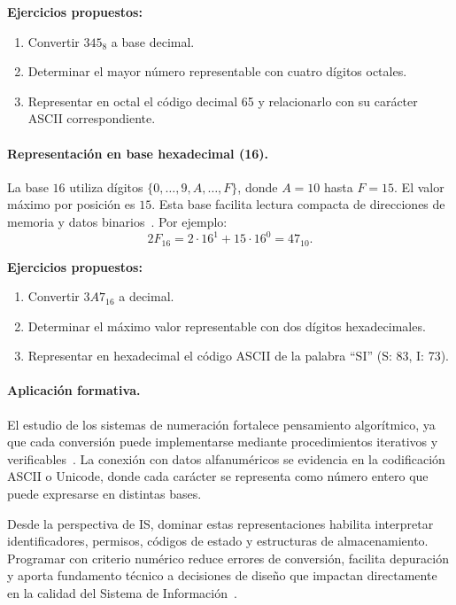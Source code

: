 \documentclass[12pt,twoside]{book}
\begin{document}
						\textbf{Ejercicios propuestos:}
						\begin{enumerate}
							\item Convertir $345_8$ a base decimal.
							\item Determinar el mayor número representable con cuatro dígitos octales.
							\item Representar en octal el código decimal 65 y relacionarlo con su carácter ASCII correspondiente.
						\end{enumerate}
						
						\paragraph{Representación en base hexadecimal (16).} La base $16$ utiliza dígitos $\{0,\dots,9,A,\dots,F\}$, donde $A=10$ hasta $F=15$. El valor máximo por posición es $15$. Esta base facilita lectura compacta de direcciones de memoria y datos binarios~\cite{Tanenbaum2021Structured,Sebesta2018Concepts,Gaddis2022Starting}. Por ejemplo:
						\[
						2F_{16} = 2\cdot16^1 + 15\cdot16^0 = 47_{10}.
						\]
						
						\textbf{Ejercicios propuestos:}
						\begin{enumerate}
							\item Convertir $3A7_{16}$ a decimal.
							\item Determinar el máximo valor representable con dos dígitos hexadecimales.
							\item Representar en hexadecimal el código ASCII de la palabra “SI” (S: 83, I: 73).
						\end{enumerate}
						
						\paragraph{Aplicación formativa.} El estudio de los sistemas de numeración fortalece pensamiento algorítmico, ya que cada conversión puede implementarse mediante procedimientos iterativos y verificables~\cite{Wirth1976Algorithms,Hanly2015Problem,Gaddis2022Starting}. La conexión con datos alfanuméricos se evidencia en la codificación ASCII o Unicode, donde cada carácter se representa como número entero que puede expresarse en distintas bases.
						
						Desde la perspectiva de IS, dominar estas representaciones habilita interpretar identificadores, permisos, códigos de estado y estructuras de almacenamiento. Programar con criterio numérico reduce errores de conversión, facilita depuración y aporta fundamento técnico a decisiones de diseño que impactan directamente en la calidad del Sistema de Información~\cite{Laudon2020Management,Tanenbaum2021Structured,Sommerville2015Software}.
						
\end{document}
